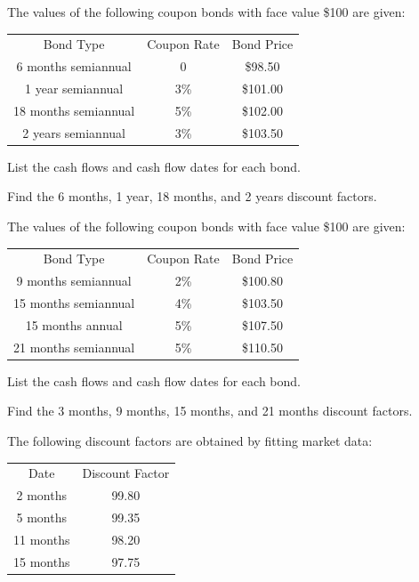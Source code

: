 \begin{exercises}
\item The values of the following coupon bonds with face value \$100 are given:

\begin{center}
\begin{tabular}{ccc}
Bond Type & Coupon Rate & Bond Price \\[0.4em]
6 months semiannual & 0 & \$98.50 \\
1 year semiannual & 3\% & \$101.00 \\
18 months semiannual & 5\% & \$102.00 \\
2 years semiannual & 3\% & \$103.50 \\
\end{tabular}
\end{center}

\begin{subparts}
\item List the cash flows and cash flow dates for each bond.
\item Find the 6 months, 1 year, 18 months, and 2 years discount factors.
\end{subparts}

\item The values of the following coupon bonds with face value \$100 are given:

\begin{center}
\begin{tabular}{ccc}
Bond Type & Coupon Rate & Bond Price \\[0.4em]
9 months semiannual & 2\% & \$100.80 \\
15 months semiannual & 4\% & \$103.50 \\
15 months annual & 5\% & \$107.50 \\
21 months semiannual & 5\% & \$110.50 \\
\end{tabular}
\end{center}

\begin{subparts}
\item List the cash flows and cash flow dates for each bond.
\item Find the 3 months, 9 months, 15 months, and 21 months discount factors.
\end{subparts}

\item The following discount factors are obtained by fitting market data:

\begin{center}
\begin{tabular}{cc}
Date & Discount Factor \\[0.4em]
2 months & 99.80 \\
5 months & 99.35 \\
11 months & 98.20 \\
15 months & 97.75 \\
\end{tabular}
\end{center}


\end{exercises}
